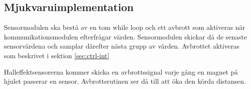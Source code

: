 \documentclass[designspec/spec.tex]{subfiles}
\begin{document}
\subsection{Mjukvaruimplementation} 
Sensormodulen ska bestå av en tom while loop och ett avbrott som aktiveras när
kommunikationsmodulen efterfrågar värden. Sensormodulen skickar då de senaste
sensorvärdena och samplar därefter nästa grupp av värden. Avbrottet aktiveras
som beskrivet i sektion \ref{sec:ctrl-int}

Halleffektsensorerna kommer skicka en avbrottssignal varje gång en magnet på
hjulet passerar en sensor. Avbrottsrutinen ser då till att öka den körda
distansen.
\end{document}
